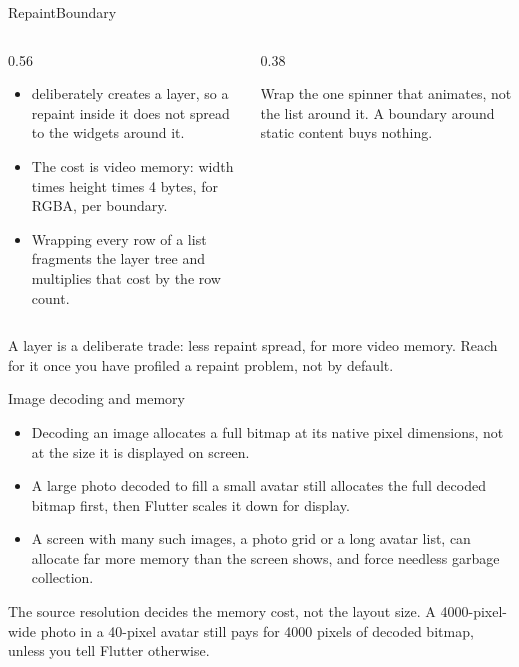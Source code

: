 \documentclass[10pt,aspectratio=169,t]{beamer}
\begin{document}
\begin{frame}[eyebrow=Optimization]{RepaintBoundary}
  \begin{columns}[T]
    \begin{column}{0.56\textwidth}
      \begin{itemize}
        \item {} deliberately creates a layer, so a repaint inside it does not spread to the widgets around it.
        \item The cost is video memory: width times height times 4 bytes, for RGBA, per boundary.
        \item Wrapping every row of a list fragments the layer tree and multiplies that cost by the row count.
      \end{itemize}
    \end{column}
    \begin{column}{0.38\textwidth}
      \begin{warning}
        Wrap the one spinner that animates, not the list around it. A boundary around static content buys nothing.
      \end{warning}
    \end{column}
  \end{columns}
  \begin{takeaway}{A layer is a deliberate trade: less repaint spread, for more video memory.}
    Reach for it once you have profiled a repaint problem, not by default.
  \end{takeaway}
\end{frame}

\begin{frame}[eyebrow=Optimization]{Image decoding and memory}
  \begin{itemize}
    \item Decoding an image allocates a full bitmap at its native pixel dimensions, not at the size it is displayed on screen.
    \item A large photo decoded to fill a small avatar still allocates the full decoded bitmap first, then Flutter scales it down for display.
    \item A screen with many such images, a photo grid or a long avatar list, can allocate far more memory than the screen shows, and force needless garbage collection.
  \end{itemize}
  \begin{takeaway}{The source resolution decides the memory cost, not the layout size.}
    A 4000-pixel-wide photo in a 40-pixel avatar still pays for 4000 pixels of decoded bitmap, unless you tell Flutter otherwise.
  \end{takeaway}
\end{frame}
\end{document}
